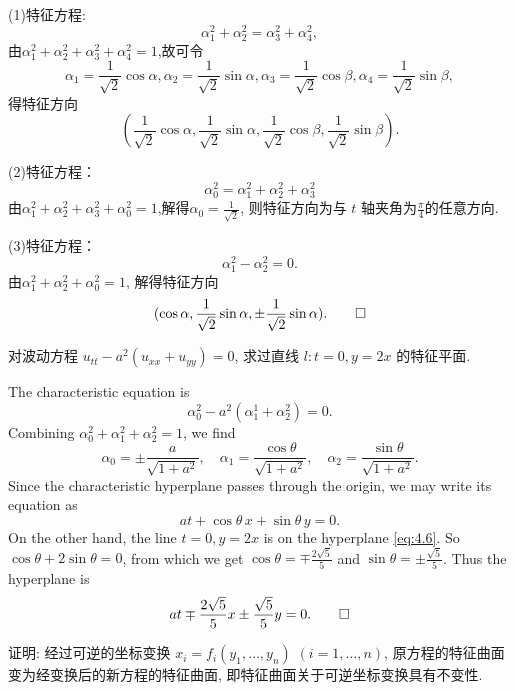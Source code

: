 \begin{solve}
	(1)特征方程:
	$$\alpha_1^2+\alpha_2^2=\alpha_3^2+\alpha_4^2,$$
	由$\alpha_1^2+\alpha_2^2+\alpha_3^2+\alpha_4^2=1$,故可令
	$$\alpha_{1}=\frac{1}{\sqrt{2}}\cos\alpha,\alpha_{2}=\frac{1}{\sqrt{2}}\sin\alpha,\alpha_{3}=\frac{1}{\sqrt{2}}\cos\beta,\alpha_{4}=\frac{1}{\sqrt{2}}\sin\beta,$$
	得特征方向
	$$(\frac1{\sqrt{2}}\cos\alpha,\frac1{\sqrt{2}}\sin\alpha,\frac1{\sqrt{2}}\cos\beta,\frac1{\sqrt{2}}\sin\beta).$$
	
	(2)特征方程：
	$$\alpha_0^2=\alpha_1^2+\alpha_2^2+\alpha_3^2$$
	由$\alpha_1^2+\alpha_2^2+\alpha_3^2+\alpha_0^2=1$,解得$\alpha_0=\frac1{\sqrt{2}}$,	则特征方向为与 $t$ 轴夹角为$\frac\pi4$的任意方向.
	
	(3)特征方程：
	$$\alpha_1^2-\alpha_2^2=0.$$
	由$\alpha_1^2+\alpha_2^2+\alpha_0^2=1$, 解得特征方向
	\[(\cos\alpha,\frac1{\sqrt{2}}\sin\alpha,\pm\frac1{\sqrt{2}}\sin\alpha).\qedhere\]
\end{solve}


\begin{exercise}
  对波动方程 $u_{tt} - a^2(u_{xx}+u_{yy}) = 0$, 求过直线 $l: t = 0, y = 2x$ 的特征平面.
\end{exercise}

\begin{solve}
  The characteristic equation is
  \[\alpha_0^2-a^2(\alpha_1^1+\alpha_2^2) = 0.\]
  Combining $\alpha_0^2+\alpha_1^2+\alpha_2^2=1$, we find
  \[\alpha_0 = \pm\frac{a}{\sqrt{1+a^2}},
    \quad \alpha_1=\frac{\cos\theta}{\sqrt{1+a^2}},
    \quad \alpha_2=\frac{\sin\theta}{\sqrt{1+a^2}}.\]
  Since the characteristic hyperplane passes through the origin,
  we may write its equation as
  \begin{equation}\label{eq:4.6}
    at + \cos\theta\, x + \sin\theta\, y = 0.
  \end{equation}
  On the other hand, the line $t=0, y=2x$ is on the hyperplane \eqref{eq:4.6}.
  So $\cos\theta+2\sin\theta = 0$, from which we get
  $\cos\theta = \mp\frac{2\sqrt{5}}{5}$ and $\sin\theta = \pm\frac{\sqrt{5}}{5}$.
  Thus the hyperplane is
  \[ at \mp \frac{2\sqrt{5}}{5}x \pm \frac{\sqrt{5}}{5}y = 0. \qedhere \]
\end{solve}


\begin{exercise}
  证明: 经过可逆的坐标变换 $x_i = f_i(y_1, \ldots, y_n)$ $(i=1, \ldots, n)$,
  原方程的特征曲面变为经变换后的新方程的特征曲面,
  即特征曲面关于可逆坐标变换具有不变性.
\end{exercise}

